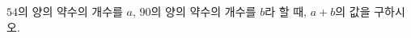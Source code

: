 \hspace*{2mm}\begin{minipage}[t]{\dimexpr\linewidth-2mm\relax}\vspace{0pt}
$54$의 양의 약수의 개수를 $a$, $90$의 양의 약수의 개수를 $b$라 할 때, $a+b$의 값을 구하시오.\end{minipage}
